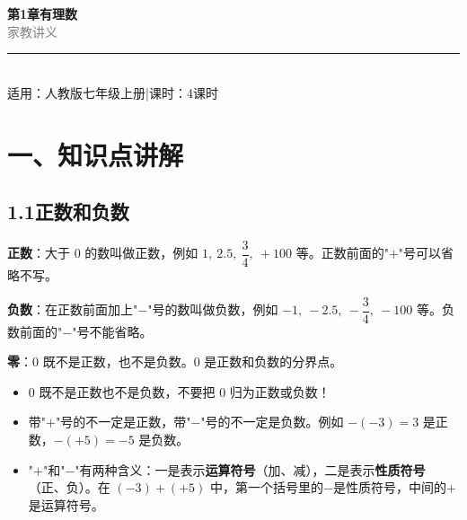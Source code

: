 \documentclass[12pt, a4paper]{ctexart}
\begin{document}
\begin{center}
{\Huge\bfseries\textcolor{mainblue}{第1章\quad 有理数}}\\[12pt]
{\Large\textcolor{gray}{家\quad 教\quad 讲\quad 义}}\\[8pt]
\rule{0.6\textwidth}{1pt}\\[8pt]
{\normalsize 适用：人教版\quad 七年级上册\quad |\quad 课时：4课时}
\end{center}
\vspace{10pt}

\section*{\textcolor{mainblue}{一、知识点讲解}}

\subsection*{1.1\quad 正数和负数}

\begin{knowledgebox}[正数和负数的概念]
\textbf{正数}：大于 $0$ 的数叫做正数，例如 $1,\ 2.5,\ \dfrac{3}{4},\ +100$ 等。正数前面的"$+$"号可以省略不写。

\textbf{负数}：在正数前面加上"$-$"号的数叫做负数，例如 $-1,\ -2.5,\ -\dfrac{3}{4},\ -100$ 等。负数前面的"$-$"号不能省略。

\textbf{零}：$0$ 既不是正数，也不是负数。$0$ 是正数和负数的分界点。
\end{knowledgebox}

\begin{warnbox}[易错提醒]
\begin{itemize}[leftmargin=*]
  \item $0$ 既不是正数也不是负数，不要把 $0$ 归为正数或负数！
  \item 带"$+$"号的不一定是正数，带"$-$"号的不一定是负数。例如 $-(-3) = 3$ 是正数，$-(+5) = -5$ 是负数。
  \item "$+$"和"$-$"有两种含义：一是表示\textbf{运算符号}（加、减），二是表示\textbf{性质符号}（正、负）。在 $(-3)+(+5)$ 中，第一个括号里的$-$是性质符号，中间的$+$是运算符号。
\end{itemize}
\end{warnbox}
\end{document}
